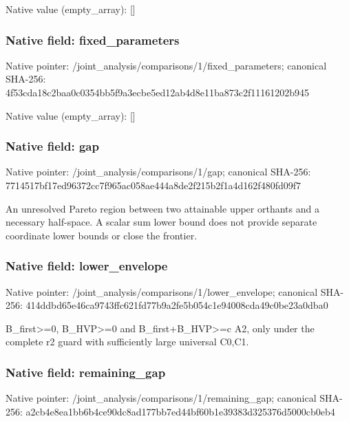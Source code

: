 \documentclass[10pt,a4paper]{article}
\begin{document}
Native value (empty\_\allowbreak{}array): []

\subsubsection{Native field: fixed\_\allowbreak{}parameters}
Native pointer: /joint\_\allowbreak{}analysis/comparisons/1/fixed\_\allowbreak{}parameters; canonical SHA-256: 4f53cda18c2baa0c0354bb5f9a3ecbe5ed12ab4d8e11ba873c2f11161202b945

Native value (empty\_\allowbreak{}array): []

\subsubsection{Native field: gap}
Native pointer: /joint\_\allowbreak{}analysis/comparisons/1/gap; canonical SHA-256: 7714517bf17ed96372cc7f965ac058ae444a8de2f215b2f1a4d162f480fd09f7

\begingroup\raggedright\sloppy An unresolved Pareto region between two attainable upper orthants and a necessary half-space. A scalar sum lower bound does not provide separate coordinate lower bounds or close the frontier.\par\endgroup

\subsubsection{Native field: lower\_\allowbreak{}envelope}
Native pointer: /joint\_\allowbreak{}analysis/comparisons/1/lower\_\allowbreak{}envelope; canonical SHA-256: 414ddbd65e46ca9743ffc621fd77b9a2fe5b054c1e94008cda49c0be23a0dba0

\begingroup\raggedright\sloppy B\_\allowbreak{}first>=\allowbreak{}0,\allowbreak{} B\_\allowbreak{}HVP>=\allowbreak{}0 and B\_\allowbreak{}first+B\_\allowbreak{}HVP>=\allowbreak{}c A2,\allowbreak{} only under the complete r2 guard with sufficiently large universal C0,\allowbreak{}C1.\par\endgroup

\subsubsection{Native field: remaining\_\allowbreak{}gap}
Native pointer: /joint\_\allowbreak{}analysis/comparisons/1/remaining\_\allowbreak{}gap; canonical SHA-256: a2cb4e8ea1bb6b4ce90dc8ad177bb7ed44bf60b1e39383d325376d5000cb0eb4
\end{document}
